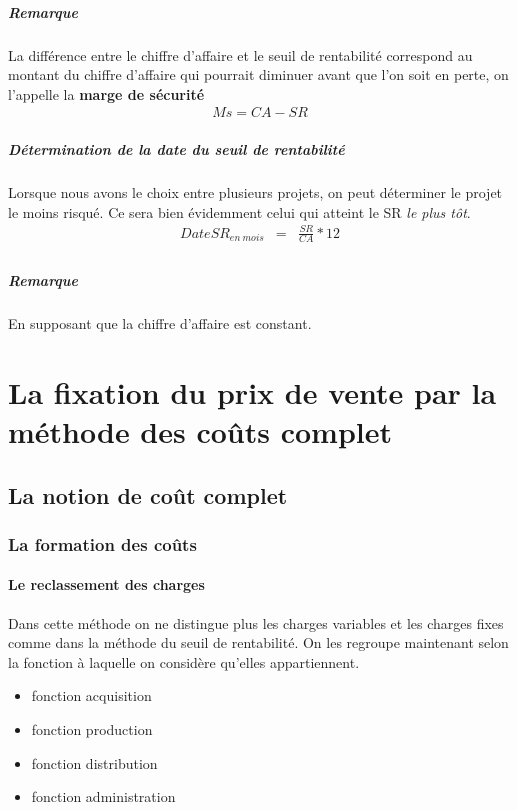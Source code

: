 \documentclass[12pt,a4paper,openany]{report}
\begin{document}
	\paragraph{Remarque}La différence entre le chiffre d'affaire et le seuil de rentabilité correspond au montant du chiffre
	d'affaire qui pourrait diminuer avant que l'on soit en perte, on l'appelle la \textbf{marge de sécurité}
	\begin{eqnarray*}
	Ms = CA-SR
\end{eqnarray*}
	\paragraph{Détermination de la date du seuil de rentabilité}
	Lorsque nous avons le choix entre plusieurs projets, on peut déterminer le projet le moins risqué.
	Ce sera bien évidemment celui qui atteint le SR \textit{le plus tôt}.
	\begin{eqnarray*}
		DateSR_{en~mois} &=& \frac{SR}{CA} * 12\\
	\end{eqnarray*}
	\paragraph{Remarque} En supposant que la chiffre d'affaire est constant. 
	\chapter{La fixation du prix de vente par la méthode des coûts complet}
	\section{La notion de coût complet} \label{coutcomplet}
	\subsection{La formation des coûts}
	\subsubsection{Le reclassement des charges}
	Dans cette méthode on ne distingue plus les charges variables et les charges fixes comme dans la méthode du seuil de rentabilité.
	On les regroupe maintenant selon la fonction à laquelle on considère qu'elles appartiennent.
	\begin{itemize}
		\item fonction acquisition
		\item fonction production
		\item fonction distribution
		\item fonction administration
	\end{itemize}
\end{document}
